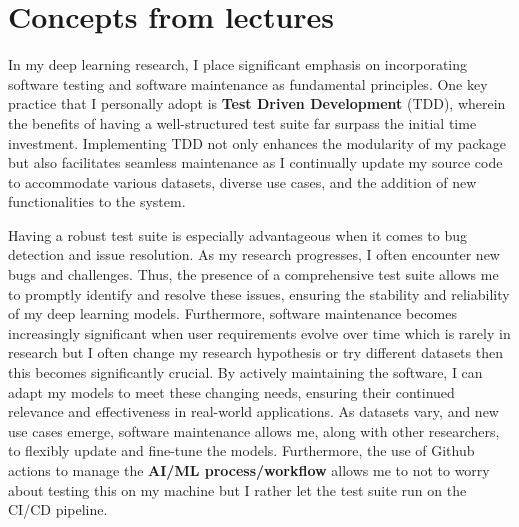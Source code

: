 \documentclass[11pt]{article}
\begin{document}
\section*{Concepts from lectures}

In my deep learning research, I place significant emphasis on incorporating software testing and software maintenance as fundamental principles. One key practice that I personally adopt is \textbf{Test Driven Development} (TDD), wherein the benefits of having a well-structured test suite far surpass the initial time investment. Implementing TDD not only enhances the modularity of my package but also facilitates seamless maintenance as I continually update my source code to accommodate various datasets, diverse use cases, and the addition of new functionalities to the system.

Having a robust test suite is especially advantageous when it comes to bug detection and issue resolution. As my research progresses, I often encounter new bugs and challenges. Thus, the presence of a comprehensive test suite allows me to promptly identify and resolve these issues, ensuring the stability and reliability of my deep learning models. Furthermore, software maintenance becomes increasingly significant when user requirements evolve over time which is rarely in research but I often change my research hypothesis or try different datasets then this becomes significantly crucial. By actively maintaining the software, I can adapt my models to meet these changing needs, ensuring their continued relevance and effectiveness in real-world applications. As datasets vary, and new use cases emerge, software maintenance allows me, along with other researchers, to flexibly update and fine-tune the models.
Furthermore, the use of Github actions to manage the \textbf{AI/ML process/workflow} allows me to not to worry about testing this on my machine but I rather let the test suite run on the CI/CD pipeline.
\end{document}
